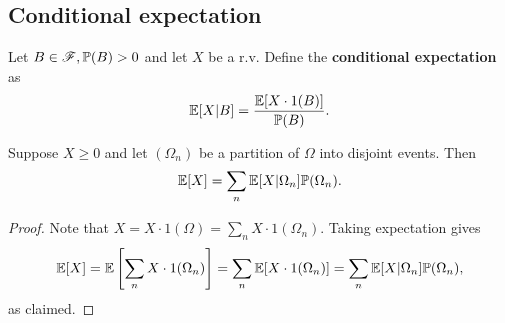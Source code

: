 \subsection{Conditional expectation}
\begin{definition}
    Let $B\in \mathscr{F},{\mathbb{P}}(B)>0$ and let $ X $ be a r.v. Define the \textbf{conditional expectation} as
    \[
        {\mathbb{E}}[X|B] = \frac{{\mathbb{E}}[X\cdot 1(B)]}{{\mathbb{P}}(B)}.
    \]
\end{definition}
\begin{proposition}\label{prop:Law of total expectation}
    Suppose $X\ge 0$ and let $ (\Omega_n) $ be a partition of $\Omega$ into disjoint events. Then 
    \[
        {\mathbb{E}}[X] = \sum_{n} {\mathbb{E}}[X|\Omega_n]\mathbb{P}(\Omega_n).
    \]
\end{proposition}
\begin{proof}
    Note that $ X=X \cdot 1(\Omega)=\sum_{n} X \cdot 1(\Omega_n) $. Taking expectation gives
    \[
    {\mathbb{E}}[X] = {\mathbb{E}}\left[ \sum_{n} X \cdot 1(\Omega_n) \right] = \sum_{n}{\mathbb{E}}[X\cdot 1(\Omega_n)]=\sum_{n} {\mathbb{E}}[X|\Omega_n]\mathbb{P}(\Omega_n),
    \]
    as claimed.
\end{proof}